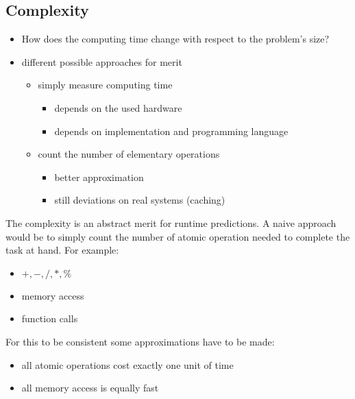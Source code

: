 \documentclass[a4paper]{article}
\begin{document}
\subsection{Complexity}
\begin{itemize}
    \item How does the computing time change with respect to the problem's size?
    \item different possible approaches for merit
        \begin{itemize}
            \item simply measure computing time
                \begin{itemize}
                    \item depends on the used hardware
                    \item depends on implementation and programming language
                \end{itemize}
            \item count the number of elementary operations
                \begin{itemize}
                    \item better approximation
                    \item still deviations on real systems (caching)
                \end{itemize}
        \end{itemize}
\end{itemize}
The complexity is an abstract merit for runtime predictions.
A naive approach would be to simply count the number of atomic operation needed to complete the task at hand.
For example:
\begin{itemize}
    \item $ +, -, /, *, \% $ 
    \item memory access
    \item function calls
\end{itemize}
For this to be consistent some approximations have to be made:
\begin{itemize}
    \item all atomic operations cost exactly one unit of time
    \item all memory access is equally fast
\end{itemize}
\end{document}
